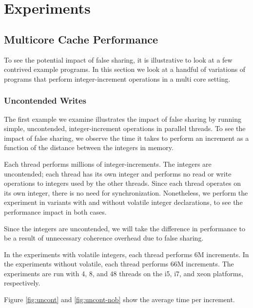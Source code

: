 \section{Experiments}
\subsection{Multicore Cache Performance}

To see the potential impact of false sharing, it is illustrative to look at a
few contrived example programs. In this section we look at a handful of
variations of programs that perform integer-increment operations in a multi core
setting.

\subsubsection{Uncontended Writes}
The first example we examine illustrates the impact of false sharing by running
simple, uncontended, integer-increment operations in parallel threads. To see
the impact of false sharing, we observe the time it takes to perform an
increment as a function of the distance between the integers in memory.


Each thread performs millions of integer-increments. The integers are
uncontended; each thread has its own integer and performs no read or write
operations to integers used by the other threads. Since each thread operates on
its own integer, there is no need for synchronization. Nonetheless, we perform
the experiment in variants with and without volatile integer declarations, to
see the performance impact in both cases.

Since the integers are uncontended, we will take the difference in performance
to be a result of unnecessary coherence overhead due to false sharing.

In the experiments with volatile integers, each thread performs 6M increments.
In the experiments without volatile, each thread performs 66M increments. The
experiments are run with 4, 8, and 48 threads on the i5, i7, and xeon platforms,
respectively.

Figure \ref{fig:uncont} and \ref{fig:uncont-nob} show the average time per
increment.


